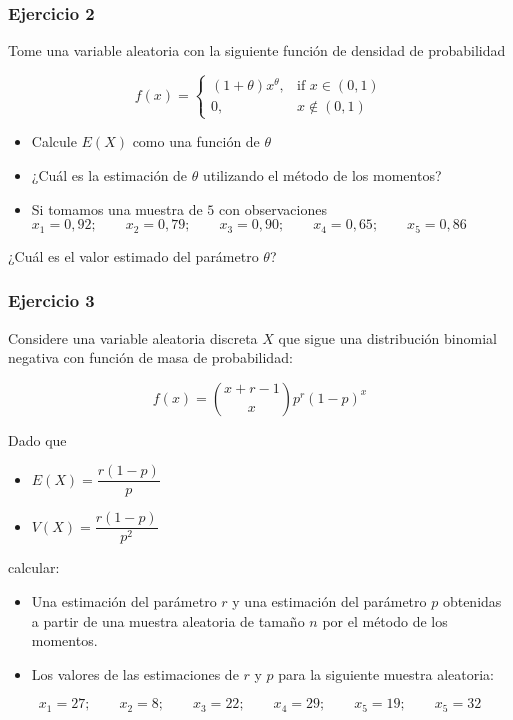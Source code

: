 \documentclass[
]{book}
\providecommand{\tightlist}{%
  \setlength{\itemsep}{0pt}\setlength{\parskip}{0pt}}
\begin{document}
\hypertarget{ejercicio-2-8}{%
\subsubsection{Ejercicio 2}\label{ejercicio-2-8}}

Tome una variable aleatoria con la siguiente función de densidad de probabilidad

\[
f(x)=
\begin{cases}
    (1+\theta)x^\theta,& \text{if } x\in (0,1)\\
    0,&x\notin (0,1)
\end{cases}
\]

\begin{itemize}
\tightlist
\item
  Calcule \(E(X)\) como una función de \(\theta\)
\item
  ¿Cuál es la estimación de \(\theta\) utilizando el método de los momentos?
\item
  Si tomamos una muestra de \(5\) con observaciones
  \(x_1 = 0,92; \qquad x_2 = 0,79; \qquad x_3 = 0,90; \qquad x_4 = 0,65; \qquad x_5 = 0,86\)
\end{itemize}

¿Cuál es el valor estimado del parámetro \(\theta\)?

\hypertarget{ejercicio-3-5}{%
\subsubsection{Ejercicio 3}\label{ejercicio-3-5}}

Considere una variable aleatoria discreta \(X\) que sigue una distribución binomial negativa con función de masa de probabilidad:

\[f(x) = \binom{x+r-1}{x}p^r(1-p)^x\]

Dado que

\begin{itemize}
\tightlist
\item
  \(E(X)=\dfrac{r(1-p)}{p}\)
\item
  \(V(X) =\dfrac{r(1-p)}{p^2}\)
\end{itemize}

calcular:

\begin{itemize}
\item
  Una estimación del parámetro \(r\) y una estimación del parámetro \(p\) obtenidas a partir de una muestra aleatoria de tamaño \(n\) por el método de los momentos.
\item
  Los valores de las estimaciones de \(r\) y \(p\) para la siguiente muestra aleatoria:
\end{itemize}

\[x_1 = 27; \qquad   x_2 = 8; \qquad   x_3 = 22; \qquad   x_4 = 29; \qquad   x_5 = 19; \qquad   x_5 = 32\]

  
\end{document}

